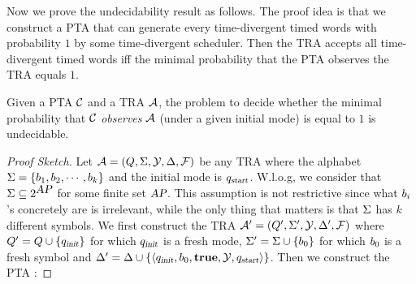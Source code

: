 Now we prove the undecidability result as follows.
The proof idea is that we construct a PTA that can generate every time-divergent timed words with probability $1$ by some time-divergent scheduler.
Then the TRA accepts all time-divergent timed words iff the minimal probability that the PTA observes the TRA equals $1$.
%
\begin{theorem}\label{thm:traundecidability}
Given a PTA $\mathcal{C}$ and a TRA $\mathcal{A}$, the problem to decide whether the minimal probability
that $\mathcal{C}$ \emph{observes} $\mathcal{A}$ (under a given initial mode) is equal to $1$ is undecidable.
\end{theorem}
%
\begin{proof}[Proof Sketch]
Let $\mathcal{A}=(Q,\Sigma,\mathcal{Y},\Delta,\mathcal{F})$ be any TRA where the alphabet $\Sigma = \{b_{1}, b_{2}, \cdots, b_{k}\}$ and the initial mode is $q_{\mbox{\sl\scriptsize start}}$.
W.l.o.g, we consider that $\Sigma\subseteq 2^{\mbox{\sl AP}}$ for some finite set $\mbox{\sl AP}$.
This assumption is not restrictive since what $b_{i}$'s concretely are is irrelevant, while the only thing that matters is that $\Sigma$ has $k$ different symbols.
We first construct the TRA $\mathcal{A}' = (Q', \Sigma', \mathcal{Y}, \Delta',\mathcal{F})$ where
$Q'   = Q  \cup \{ q_{\mbox{\sl\scriptsize init} } \}$ for which $q_{\mbox{\sl\scriptsize init} }$ is a fresh mode,
$\Sigma'  = \Sigma \cup \{ b_{0} \}$ for which $b_{0}$ is a fresh symbol and
$\Delta'     = \Delta    \cup \{ \langle
            q_{\mbox{\sl\scriptsize init} },
            b_{0},
            \mathbf{true},
            \mathcal{Y},
            q_{\mbox{\sl\scriptsize start}}
        \rangle
    \}$.
Then we construct the PTA :

\end{proof}
